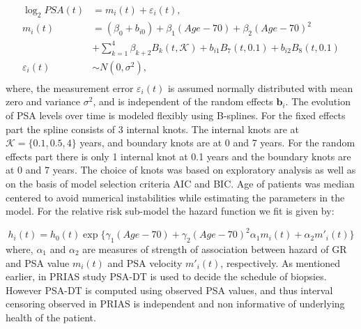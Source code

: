 \begin{equation}
\label{eq : long_model_prias}
\begin{aligned}
\log_2 PSA(t) &= m_i(t) + \varepsilon_i(t), \\
m_i(t) &= (\beta_0 + b_{i0}) + \beta_1 (Age-70) + \beta_2 (Age-70)^2\\ 
&+ \sum_{k=1}^4 \beta_{k+2} B_k(t,\mathcal{K}) + b_{i1} B_7(t, 0.1) + b_{i2} B_8(t, 0.1) \\
\varepsilon_i(t) & \sim N(0, \sigma^2),\\
\end{aligned}
\end{equation}
where, the measurement error $\varepsilon_i(t)$ is assumed normally distributed with mean zero and variance $\sigma^2$, and is independent of the random effects $\boldsymbol{b}_i$. The evolution of PSA levels over time is modeled flexibly using B-splines. For the fixed effects part the spline consists of 3 internal knots. The internal knots are at $\mathcal{K} =\{0.1, 0.5, 4\}$ years, and boundary knots are at 0 and 7 years. For the random effects part there is only 1 internal knot at 0.1 years and the boundary knots are at 0 and 7 years. The choice of knots was based on exploratory analysis as well as on the basis of model selection criteria AIC and BIC. Age of patients was median centered to avoid numerical instabilities while estimating the parameters in the model. For the relative risk sub-model the hazard function we fit is given by:

\begin{equation}
\label{eq : hazard_prias}
h_i(t) = h_0(t) \exp\{\gamma_1 (Age-70)  + \gamma_2 (Age-70)^2  \alpha_1 m_i(t) + \alpha_2 m'_i(t)\}
\end{equation}
where, $\alpha_1$ and $\alpha_2$ are measures of strength of association between hazard of GR and PSA value $m_i(t)$ and PSA velocity $m'_i(t)$, respectively. As mentioned earlier, in PRIAS study PSA-DT is used to decide the schedule of biopsies. However PSA-DT is computed using observed PSA values, and thus interval censoring observed in PRIAS is independent and non informative of underlying health of the patient.


